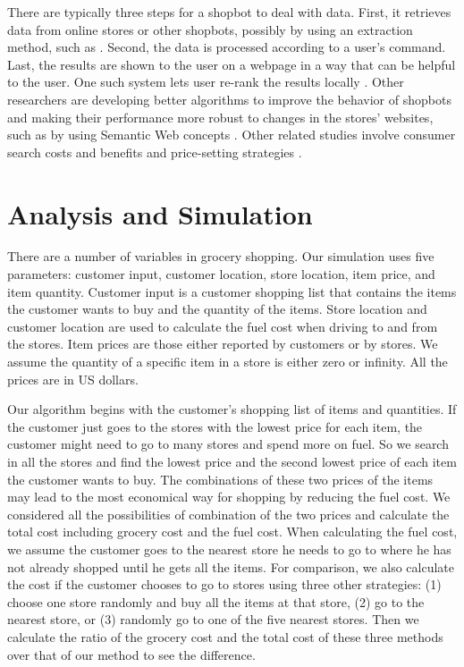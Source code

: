 There are typically three steps for a shopbot to deal with data. First, it retrieves data from online stores or other shopbots, possibly by using an extraction method, such as \cite{yang2005}. Second, the data is processed according to a user's command. Last, the results are shown to the user on a webpage in a way that can be helpful to the user. One such system lets user re-rank the results locally \cite{buchholz2004}. Other researchers are developing better algorithms to improve the behavior of shopbots and making their performance more robust to changes in the stores' websites, such as by using Semantic Web concepts \cite{li2004}. Other related studies involve consumer search costs and benefits \cite{brynjolfsson2010} \cite{tang2010} and price-setting strategies \cite{greenwald2000}.

\section{Analysis and Simulation}

There are a number of variables in grocery shopping. Our simulation uses five parameters: customer input, customer location, store location, item price, and item quantity. Customer input is a customer shopping list that contains the items the customer wants to buy and the quantity of the items. Store location and customer location are used to calculate the fuel cost when driving to and from the stores. Item prices are those either reported by customers or by stores. We assume the quantity of a specific item in a store is either zero or infinity. All the prices are in US dollars. 

Our algorithm begins with the customer's shopping list of items and quantities. If the customer just goes to the stores with the lowest price for each item, the customer might need to go to many stores and spend more on fuel. So we search in all the stores and find the lowest price and the second lowest price of each item the customer wants to buy. The combinations of these two prices of the items may lead to the most economical way for shopping by reducing the fuel cost. We considered all the possibilities of combination of the two prices and calculate the total cost including grocery cost and the fuel cost. When calculating the fuel cost, we assume the customer goes to the nearest store he needs to go to where he has not already shopped until he gets all the items. For comparison, we also calculate the cost if the customer chooses to go to stores using three other strategies: (1) choose one store randomly and buy all the items at that store, (2) go to the nearest store, or (3) randomly go to one of the five nearest stores. Then we calculate the ratio of the grocery cost and the total cost of these three methods over that of our method to see the difference.

